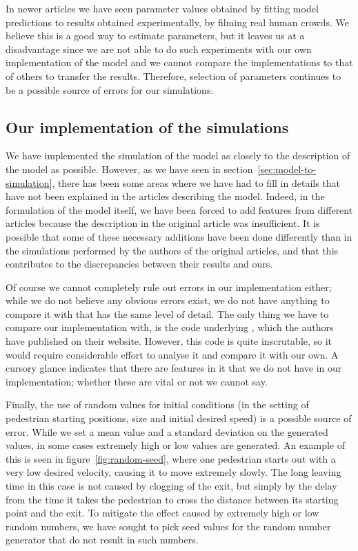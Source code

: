 In newer articles we have seen parameter values obtained by fitting model 
predictions to results obtained experimentally, by filming real human crowds.  
We believe this is a good way to estimate parameters, but it leaves us at a 
disadvantage since we are not able to do such experiments with our own 
implementation of the model and we cannot compare the implementations to that 
of others to transfer the results. Therefore, selection of parameters 
continues to be a possible source of errors for our simulations.

\subsection{Our implementation of the simulations}
\label{sec:random-errors}
We have implemented the simulation of the model as closely to the description 
of the model as possible. However, as we have seen in 
section~\ref{sec:model-to-simulation}, there has been some areas where we have 
had to fill in details that have not been explained in the articles describing 
the model. Indeed, in the formulation of the model itself, we have been forced 
to add features from different articles because the description in the 
original article was insufficient. It is possible that some of these necessary 
additions have been done differently than in the simulations performed by the 
authors of the original articles, and that this contributes to the 
discrepancies between their results and ours.

Of course we cannot completely rule out errors in our implementation either; 
while we do not believe any obvious errors exist, we do not have anything to 
compare it with that has the same level of detail. The only thing we have to 
compare our implementation with, is the code underlying \cite{helbing00}, 
which the authors have published on their website. However, this code is quite 
inscrutable, so it would require considerable effort to analyse it and compare 
it with our own. A cursory glance indicates that there are features in it that 
we do not have in our implementation; whether these are vital or not we cannot 
say.

Finally, the use of random values for initial conditions (in the setting of 
pedestrian starting positions, size and initial desired speed) is a possible 
source of error. While we set a mean value and a standard deviation on the 
generated values, in some cases extremely high or low values are generated. An 
example of this is seen in figure~\ref{fig:random-seed}, where one pedestrian 
starts out with a very low desired velocity, causing it to move extremely 
slowly. The long leaving time in this case is not caused by clogging of the 
exit, but simply by the delay from the time it takes the pedestrian to cross 
the distance between its starting point and the exit. To mitigate the effect 
caused by extremely high or low random numbers, we have sought to pick seed 
values for the random number generator that do not result in such numbers.

